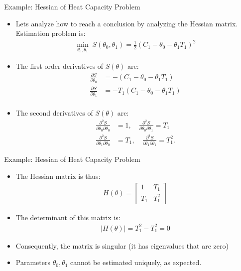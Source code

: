 \documentclass[9pt]{beamer}
\begin{document}
%
\begin{frame}{Example: Hessian of Heat Capacity Problem}

\begin{itemize}
\item Lets analyze how to reach a conclusion by analyzing the Hessian matrix. Estimation problem is:
\begin{align*}
\min_{\theta_0,\theta_1} \; S(\theta_0,\theta_1)=\frac{1}{2}(C_1-\theta_0-\theta_1T_1)^2
\end{align*}
\item The first-order derivatives of $S(\theta)$ are:
\begin{align*}
\frac{\partial S}{\partial \theta_0}&=-(C_1-\theta_0-\theta_1 T_1)\\
\frac{\partial S}{\partial \theta_1}&=-T_1(C_1-\theta_0-\theta_1 T_1)\\
\end{align*}
\item The second derivatives of $S(\theta)$ are:
\begin{align*}
\frac{\partial^2 S}{\partial \theta_0 \partial \theta_0}&=1,\quad \frac{\partial^2 S}{\partial \theta_0\partial \theta_1}=T_1\\
\frac{\partial^2 S}{\partial \theta_1 \partial \theta_0}&=T_1,\quad \frac{\partial^2 S}{\partial \theta_1 \partial \theta_1}=T_1^2.
\end{align*}
\end{itemize}

\end{frame}

%
\begin{frame}{Example: Hessian of Heat Capacity Problem}

\begin{itemize}
\item The Hessian matrix is thus:
\begin{align*}
H(\theta)=\left[\begin{array}{cc}1&T_1\\ T_1 & T_1^2\end{array}\right]
\end{align*}
\item The determinant of this matrix is:
\begin{align*}
|H(\theta)|=T_1^2-T_1^2=0
\end{align*}
\item Consequently, the matrix is singular (it has eigenvalues that are zero)
\item Parameters $\theta_0,\theta_1$ cannot be estimated uniquely, as expected. 
\end{itemize}

\end{frame}
\end{document}
